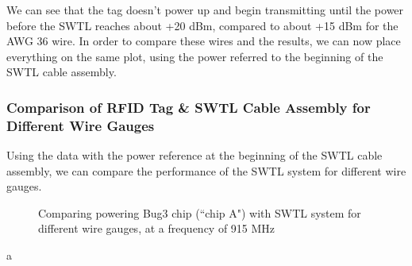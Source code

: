 \documentclass[12pt,onecolumn,titlepage]{article}
\begin{document}
We can see that the tag doesn't power up and begin transmitting until the power before the SWTL reaches about +20 dBm, compared to about +15 dBm for the AWG 36 wire. In order to compare these wires and the results, we can now place everything on the same plot, using the power referred to the beginning of the SWTL cable assembly.



\subsubsection{Comparison of RFID Tag \& SWTL Cable Assembly for Different Wire Gauges}
\indent \indent Using the data with the power reference at the beginning of the SWTL cable assembly, we can compare the performance of the SWTL system for different wire gauges. 



\begin{figure}[htbp]
	\centering
		\quad
		
	\label{fig:SWTL_w_tag_2D_SWTLref_combineplot}
	\caption{Comparing powering Bug3 chip (``chip A") with SWTL system for different wire gauges, at a frequency of 915 MHz }
\end{figure}



a
\end{document}
